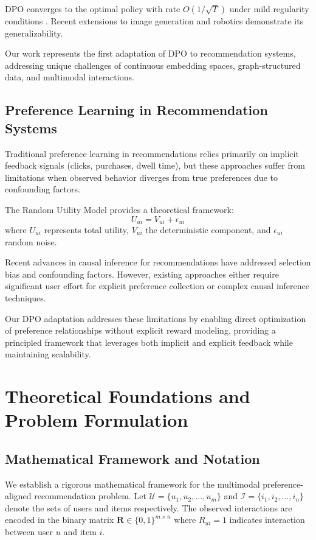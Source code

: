 \documentclass[pdflatex,sn-mathphys-num]{sn-jnl}%
\theoremstyle{thmstyleone}%
\theoremstyle{thmstyletwo}%
\theoremstyle{thmstylethree}%
\begin{document}
DPO converges to the optimal policy with rate $O(1/\sqrt{T})$ under mild regularity conditions \cite{yuan2024self}. Recent extensions to image generation \cite{wallace2024diffusion} and robotics \cite{hejna2024few} demonstrate its generalizability.

Our work represents the first adaptation of DPO to recommendation systems, addressing unique challenges of continuous embedding spaces, graph-structured data, and multimodal interactions.

\subsection{Preference Learning in Recommendation Systems}

Traditional preference learning in recommendations relies primarily on implicit feedback signals (clicks, purchases, dwell time), but these approaches suffer from limitations when observed behavior diverges from true preferences due to confounding factors.

The Random Utility Model provides a theoretical framework:
\begin{equation}
U_{ui} = V_{ui} + \epsilon_{ui}
\end{equation}
where $U_{ui}$ represents total utility, $V_{ui}$ the deterministic component, and $\epsilon_{ui}$ random noise.

Recent advances in causal inference for recommendations \cite{schnabel2016recommendations} have addressed selection bias and confounding factors. However, existing approaches either require significant user effort for explicit preference collection or complex causal inference techniques.

Our DPO adaptation addresses these limitations by enabling direct optimization of preference relationships without explicit reward modeling, providing a principled framework that leverages both implicit and explicit feedback while maintaining scalability.

\section{Theoretical Foundations and Problem Formulation}\label{sec:preliminaries}

\subsection{Mathematical Framework and Notation}

We establish a rigorous mathematical framework for the multimodal preference-aligned recommendation problem. Let $\mathcal{U} = \{u_1, u_2, \ldots, u_m\}$ and $\mathcal{I} = \{i_1, i_2, \ldots, i_n\}$ denote the sets of users and items respectively. The observed interactions are encoded in the binary matrix $\mathbf{R} \in \{0,1\}^{m \times n}$ where $R_{ui} = 1$ indicates interaction between user $u$ and item $i$.
\end{document}
